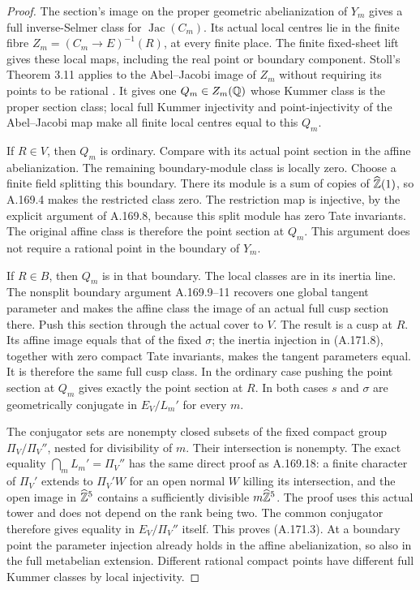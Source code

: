 \begin{proof}
The section's image on the proper geometric abelianization of
\(Y_m\) gives a full inverse-Selmer class for
\(\operatorname{Jac}(C_m)\).  Its actual local centres lie in
the finite fibre
\(Z_m=(C_m\to E)^{-1}(R)\), at every finite place.  The
finite fixed-sheet lift gives these local maps, including the real
point or boundary component.  Stoll's Theorem 3.11 applies to the
Abel--Jacobi image of \(Z_m\) without requiring its points to be
rational \cite[Theorem 3.11]{LegStoll2007}.  It gives one
\(Q_m\in Z_m(\mathbb Q)\) whose Kummer class is the proper section
class; local full Kummer injectivity and point-injectivity of the
Abel--Jacobi map make all finite local centres equal to this
\(Q_m\).

If \(R\in V\), then \(Q_m\) is ordinary.  Compare with its
actual point section in the affine abelianization.  The remaining
boundary-module class is locally zero.  Choose a finite field
splitting this boundary.  There its module is a sum of copies of
\(\widehat{\mathbb Z}(1)\), so A.169.4 makes the restricted class zero.
The restriction map is injective, by the explicit argument of
A.169.8, because this split module has zero Tate invariants.
The original affine class is therefore the point section at
\(Q_m\).  This argument does not require a rational point in the
boundary of \(Y_m\).

If \(R\in B\), then \(Q_m\) is in that boundary.  The
local classes are in its inertia line.  The nonsplit boundary
argument A.169.9--11 recovers one global tangent parameter and makes
the affine class the image of an actual full cusp section there.
Push this section through the actual cover to \(V\).  The
result is a cusp at \(R\).  Its affine image equals that of the
fixed \(\sigma\); the inertia injection in (A.171.8), together
with zero compact Tate invariants, makes the tangent parameters
equal.  It is therefore the same full cusp class.  In the ordinary
case pushing the point section at \(Q_m\) gives exactly the point
section at \(R\).  In both cases \(s\) and \(\sigma\) are
geometrically conjugate in \(E_V/L_m'\) for every \(m\).

The conjugator sets are nonempty closed subsets of the fixed compact
group \(\Pi_V/\Pi_V''\), nested for divisibility of \(m\).
Their intersection is nonempty.  The exact equality
\(\bigcap_mL_m'=\Pi_V''\) has the same direct proof as
A.169.18: a finite character of \(\Pi_V'\) extends to
\(\Pi_V'W\) for an open normal \(W\) killing its intersection,
and the open image in \(\widehat{\mathbb Z}^5\) contains a sufficiently
divisible \(m\widehat{\mathbb Z}^5\).  The proof uses this actual tower
and does not depend on the rank being two.  The common conjugator
therefore gives equality in \(E_V/\Pi_V''\) itself.
This proves (A.171.3).  At a boundary point the parameter injection
already holds in the affine abelianization, so also in the full
metabelian extension.  Different rational compact points have
different full Kummer classes by local injectivity.


\end{proof}

